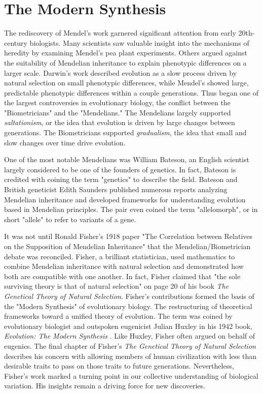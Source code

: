 \section{The Modern Synthesis}
The rediscovery of Mendel's work garnered significant attention from early 20th-century biologists. Many scientists saw valuable insight into the mechanisms of heredity by examining Mendel's pea plant experiments. Others argued against the suitability of Mendelian inheritance to explain phenotypic differences on a larger scale. Darwin's work described evolution as a slow process driven by natural selection on small phenotypic differences, while Mendel's showed large, predictable phenotypic differences within a couple generations. Thus began one of the largest controversies in evolutionary biology, the conflict between the "Biometricians" and the "Mendelians." The Mendelians largely supported \textit{saltationism}, or the idea that evolution is driven by large changes between generations. The Biometricians supported \textit{gradualism}, the idea that small and slow changes over time drive evolution. 


One of the most notable Mendelians was William Bateson, an English scientist largely considered to be one of the founders of genetics. In fact, Bateson is credited with coining the term "genetics" to describe the field. Bateson and British geneticist Edith Saunders published numerous reports analyzing Mendelian inheritance and developed frameworks for understanding evolution based in Mendelian principles. \cite{bateson_1902} The pair even coined the term "allelomorph", or in short "allele" to refer to variants of a gene.  


It was not until Ronald Fisher's 1918 paper "The Correlation between Relatives on the Supposition of Mendelian Inheritance" \cite{fisher_1918} that the Mendelian/Biometrician debate was reconciled. \cite{visscher_r.._2019} Fisher, a brilliant statistician, used mathematics to combine Mendelian inheritance with natural selection and demonstrated how both are compatible with one another. In fact, Fisher claimed that "the sole surviving theory is that of natural selection" on page 20 of his book \textit{The Genetical Theory of Natural Selection}.  \cite{fisher_1930} Fisher's contributions formed the basis of the "Modern Synthesis" of evolutionary biology. The restructuring of theoretical frameworks toward a unified theory of evolution. The term was coined by evolutionary biologist and outspoken eugenicist Julian Huxley in his 1942 book, \textit{Evolution: The Modern Synthesis} \cite{huxley_1942}. Like Huxley, Fisher often argued on behalf of eugenics. The final chapter of Fisher's \textit{The Genetical Theory of Natural Selection} describes his concern with allowing members of human civilization with less than desirable traits to pass on those traits to future generations. Nevertheless, Fisher's work marked a turning point in our collective understanding of biological variation. His insights remain a driving force for new discoveries.


